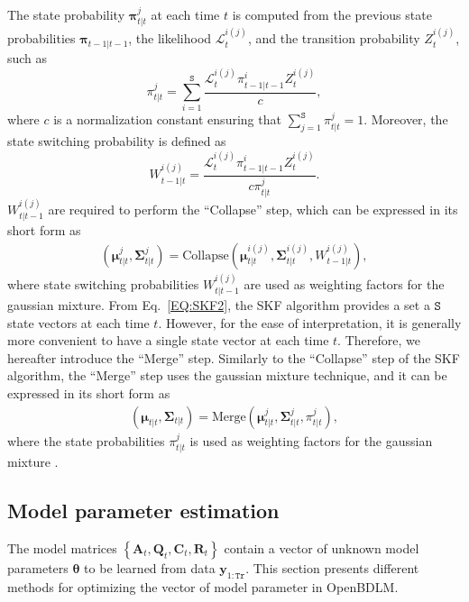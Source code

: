 The state probability $\mathbf{\pi}_{t|t}^{j}$ at each time $t$ is computed from the previous state probabilities $\bm{\pi}_{t-1|t-1}$, the likelihood $\mathcal{L}_{t}^{i(j)}$, and the transition probability $Z_{t}^{i(j)}$, such as
\begin{equation}
\pi_{t|t}^{j} = \sum_{i=1}^{\mathtt{S}} \frac{\mathcal{L}_{t}^{i(j)} \pi_{t-1|t-1}^{i} Z^{i(j)}_{t} }{c},
\label{EQ:StateProbability}
\end{equation}
where $c$ is a normalization constant ensuring that $ \sum_{j=1}^{\mathtt{S}} \pi_{t|t}^{j} = 1 $.
Moreover, the state switching probability is defined as
\begin{equation}
W_{t-1|t}^{i(j)} = \frac{\mathcal{L}_{t}^{i(j)} \pi_{t-1|t-1}^{i} Z^{i(j)}_{t} }{c\pi_{t|t}^{j}}.
\label{EQ:StateSwitchingProbability}
\end{equation}
$W_{t|t-1}^{i(j)}$ are required to perform the ``Collapse'' step, which can be expressed in its short form as
\begin{equation}
  \begin{split}
  (\bm{\mu}_{t|t}^{j},\bm{\Sigma}_{t|t}^{j}) = \text{Collapse}(\bm{\mu}_{t|t}^{i(j)},\bm{\Sigma}_{t|t}^{i(j)}, W_{t-1|t}^{i(j)} ),
    \end{split}
\label{EQ:SKF2}
\end{equation}
where state switching probabilities $W_{t|t-1}^{i(j)}$ are used as weighting factors for the gaussian mixture.
From Eq.~\ref{EQ:SKF2}, the SKF algorithm provides a set a $\mathtt{S}$ state vectors at each time $t$.
However, for the ease of interpretation, it is generally more convenient to have a single state vector at each time $t$.
Therefore, we hereafter introduce the ``Merge'' step.
Similarly to the ``Collapse'' step of the SKF algorithm, the ``Merge'' step uses the gaussian mixture technique, and it can be expressed in its short form as
\begin{equation}
  \begin{split}
  (\bm{\mu}_{t|t},\bm{\Sigma}_{t|t}) = \text{Merge}(\bm{\mu}_{t|t}^{j},\bm{\Sigma}_{t|t}^{j},  \pi_{t|t}^{j} ),
    \end{split}
\label{EQ:SKFCollapse}
\end{equation}
where the state probabilities $\pi_{t|t}^{j}$ is used as weighting factors for the gaussian mixture \cite{Nguyen2018}.

\subsection{Model parameter estimation}
\label{SS:THModelParameterEstimation}
The model matrices $\left\{\mathbf{A}_{t}, \mathbf{Q}_{t}, \mathbf{C}_{t}, \mathbf{R}_{t}\right\}$ contain a vector of unknown model parameters $\bm{\theta}$ to be learned from data $\mathbf{y}_{1:\mathtt{Tr}}$.
This section presents different methods for optimizing the vector of model parameter in OpenBDLM.
